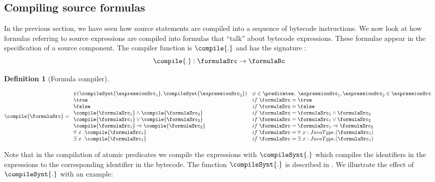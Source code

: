 \newtheorem{formulaComp}{Definition}
\newtheorem{formulaCompProp0}{Property}
\newtheorem{formulaCompProp1}[formulaCompProp0]{Property}
\newtheorem{formulaCompProp2}[formulaCompProp0]{Property}



\subsection{Compiling source formulas }
In the previous section, we have seen how source statements are compiled into a sequence of bytecode instructions.
 We now look at how formulas referring to source expressions are compiled into formulas that ``talk'' about bytecode expressions. 
These formulae appear in the specification of  a source component. 
The compiler function is $\compile{.} $ and has the signature :
$$ \compile{.} : \formulaSrc \rightarrow \formulaBc$$ 

\begin{formulaComp}[Formula compiler]
\end{formulaComp} 
$$
\compile{ \formulaSrc } =
\begin{array}{ll}
 \psi(\compileSynt{\expressionSrc_1},\compileSynt{\expressionSrc_2} ) & \psi \in \predicates, \  \expressionSrc_1 ,  \expressionSrc_2 \in \expressionSrc \\ 
\true & if \  \formulaSrc = \true \\
\false & if \  \formulaSrc = \false \\
\compile{ \formulaSrc_1 } \wedge \compile{ \formulaSrc_2 } & if \  \formulaSrc = \formulaSrc_1 \wedge \formulaSrc_2 \\
\compile{ \formulaSrc_1 } \vee \compile{ \formulaSrc_2 } & if \  \formulaSrc = \formulaSrc_1 \vee \formulaSrc_2 \\
 \compile{ \formulaSrc_1 } \Rightarrow \compile{ \formulaSrc_2 } & if \  \formulaSrc = \formulaSrc_1 \Rightarrow \formulaSrc_2 \\
 \forall \ x \ . \compile{ \formulaSrc_1 } & if \  \formulaSrc = \forall \ x: JavaType . ( \formulaSrc_1)  \\
 \exists \ x \ . \compile{ \formulaSrc_1 } & if \  \formulaSrc = \exists \ x: JavaType . ( \formulaSrc_1)  

\end{array} 
$$
 
Note that in the compilation of atomic predicates we compile the expressions with $ \compileSynt{.}$ 
which compiles the identifiers in the expressions
to the corresponding identifier in the bytecode. The function $ \compileSynt{.}$ is described in \cite{JML2BCSpec}.
We illustrate the effect of  $ \compileSynt{.}$ with an example: 

